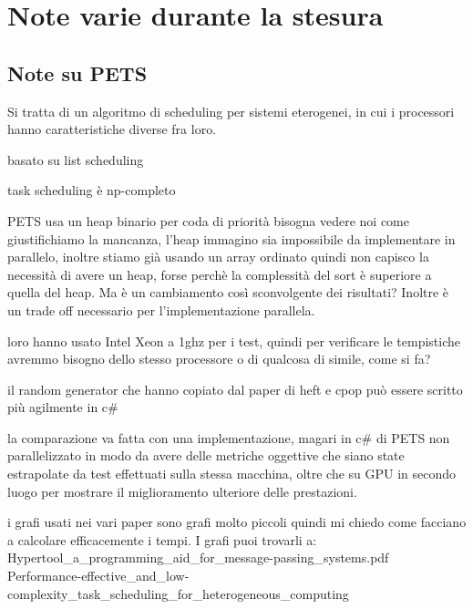 \chapter{Note varie durante la stesura}
\vspace{4cm}

\section{Note su PETS}

Si tratta di un algoritmo di scheduling per sistemi eterogenei, in cui i processori hanno caratteristiche diverse fra loro.

basato su list scheduling

task scheduling è np-completo

PETS usa un heap binario per coda di priorità bisogna vedere noi come giustifichiamo la mancanza, l'heap immagino sia impossibile da implementare in parallelo, inoltre stiamo già usando un array ordinato quindi non capisco la necessità di avere un heap, forse perchè la complessità del sort è superiore a quella del heap. Ma è un cambiamento così sconvolgente dei risultati? Inoltre è un trade off necessario per l'implementazione parallela.

loro hanno usato Intel Xeon a 1ghz per i test, quindi per verificare le tempistiche avremmo bisogno dello stesso processore o di qualcosa di simile, come si fa?

il random generator che hanno copiato dal paper  di heft e cpop può essere scritto più agilmente in c# 

la comparazione va fatta con una implementazione, magari in c# di PETS non parallelizzato in modo da avere delle metriche oggettive che siano state estrapolate da test effettuati sulla stessa macchina, oltre che su GPU in secondo luogo per mostrare il miglioramento ulteriore delle prestazioni.

i grafi usati nei vari paper sono grafi molto piccoli quindi mi chiedo come facciano a calcolare efficacemente i tempi.
I grafi puoi trovarli a: Hypertool_a_programming_aid_for_message-passing_systems.pdf
Performance-effective_and_low-complexity_task_scheduling_for_heterogeneous_computing
